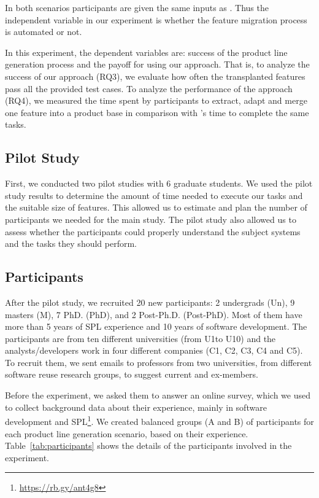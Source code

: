 In both scenarios participants are given the same inputs as \prodscalpel.
Thus the independent variable in our experiment is whether the feature migration process is automated or not.

In this experiment, the dependent variables are: success of the product line generation process and the payoff for using our approach. That is, to analyze the success of our approach (RQ3), we evaluate how often the transplanted features pass all the provided test cases.
To analyze the performance of the approach (RQ4), we measured the time spent by participants to extract, adapt and merge one feature into a product base in comparison with \prodscalpel's time to complete the same tasks.

\subsection{Pilot Study}

First, we conducted two pilot studies with 6 graduate students. 
We used the pilot study results to determine the amount of time needed to execute our tasks and the suitable size of features. This allowed us to estimate and plan the number of participants we needed for the main study. 
The pilot study also allowed us to assess whether the participants could properly understand the subject systems and the tasks they should perform. 

\subsection{Participants}

After the pilot study, we recruited 20 new participants: 2 undergrads (Un), 9 masters (M), 7 PhD. (PhD), and 2 Post-Ph.D. (Post-PhD). Most of them have more than 5 years of SPL experience and 10 years of software development. The participants are from ten different universities (from U1to U10) and the analysts/developers work in four different companies (C1, C2, C3, C4 and C5). To recruit them, we sent emails to professors from two universities, from different software reuse research groups, to suggest current and ex-members. 

Before the experiment, we asked them to answer an online survey, which we used to collect background data about their experience, mainly in software development and SPL\footnote{\url{https://rb.gy/ant4g8}}. 
We created balanced groups (A and B) of participants for each product line generation scenario, based on their experience. 
Table~\ref{tab:participants} shows the details of the participants involved in the experiment.

